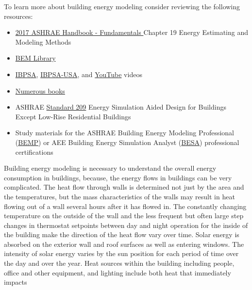 To learn more about building energy modeling consider reviewing the
following resources:
\begin{itemize}
\item \href{https://www.ashrae.org/technical-resources/ashrae-handbook/description-2017-ashrae-handbook-fundamentals}{2017 ASHRAE Handbook - Fundamentals }Chapter
19 Energy Estimating and Modeling Methods
\item \href{https://www.bemlibrary.com/}{BEM Library}
\item \href{http://www.ibpsa.org/?page_id=695}{IBPSA}, \href{https://www.ibpsa.us/videos/all}{IBPSA-USA},
and \href{https://www.youtube.com/results?search_query=building+energy+modeling}{YouTube}
videos
\item \href{https://www.amazon.com/s/ref=nb_sb_noss_2?url=search-alias\%3Daps&field-keywords=building+energy+modeling}{Numerous books}
\item ASHRAE \href{https://www.techstreet.com/ashrae/standards/ashrae-209-2018?gateway_code=ashrae&product_id=2010483}{Standard 209}
Energy Simulation Aided Design for Buildings Except Low-Rise Residential
Buildings
\item Study materials for the ASHRAE Building Energy Modeling Professional
(\href{https://www.ashrae.org/professional-development/ashrae-certification/certification-types/bemp-building-energy-modeling-professional-certification}{BEMP})
or AEE Building Energy Simulation Analyst (\href{https://www.aeecenter.org/certifications/certifications/certified-building-energy-simulation-analyst}{BESA})
professional certifications
\end{itemize}
Building energy modeling is necessary to understand the overall energy
consumption in buildings, because, the energy flows in buildings can
be very complicated. The heat flow through walls is determined not
just by the area and the temperatures, but the mass characteristics
of the walls may result in heat flowing out of a wall several hours
after it has flowed in. The constantly changing temperature on the
outside of the wall and the less frequent but often large step changes
in thermostat setpoints between day and night operation for the inside
of the building make the direction of the heat flow vary over time.
Solar energy is absorbed on the exterior wall and roof surfaces as
well as entering windows. The intensity of solar energy varies by
the sun position for each period of time over the day and over the
year. Heat sources within the building including people, office and
other equipment, and lighting include both heat that immediately impacts
